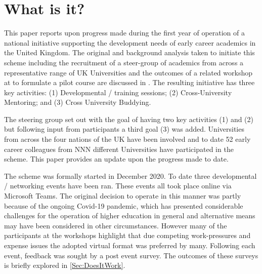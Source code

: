 \documentclass[sigconf]{acmart}
\begin{document}
\maketitle

\section{What is it?}	
\label{sec:What}
This paper reports upon progress made during the first year of operation of a national initiative supporting the development needs of early career academics in the United Kingdom. The original and background analysis taken to initiate this scheme including the recruitment of a steer-group of academics from across a representative range of UK Universities and the outcomes of a related workshop at  to formulate a pilot course are discussed in . The resulting initiative has three key activities: (1) Developmental / training sessions; (2) Cross-University Mentoring; and (3) Cross University Buddying.

The steering group set out with the goal of having two key activities (1) and (2) but following input from participants a third goal (3) was added. Universities from across the four nations of the UK have been involved and to date 52 early career colleagues from NNN different Universities have participated in the scheme. This paper provides an update upon the progress made to date.

The scheme was formally started in December 2020. To date three developmental / networking events have been ran. These events all took place online via Microsoft Teams. The original decision to operate in this manner was partly because of the ongoing Covid-19 pandemic, which has presented considerable challenges for the operation of higher education in general \cite{CrickCovidUK} and alternative means may have been considered in other circumstances. However many of the participants at the workshops highlight that due competing work-pressures and expense issues the adopted virtual format was preferred by many. Following each event, feedback was sought by a post event survey. The outcomes of these surveys is briefly explored in \ref{Sec:DoesItWork}.
\end{document}
